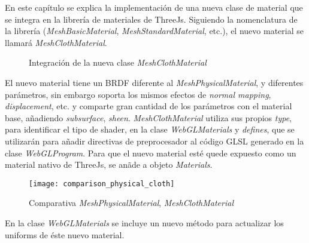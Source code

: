 En este cap\'itulo se explica la implementaci\'on de una nueva clase de material que se integra en la librer\'ia de materiales
de ThreeJs. Siguiendo la nomenclatura de la librer\'ia (\textit{MeshBasicMaterial}, \textit{MeshStandardMaterial}, etc.), el
nuevo material se llamar\'a \textit{MeshClothMaterial}.




\begin{figure}[H]
  \centering
  \caption{Integraci\'on de la nueva clase \textit{MeshClothMaterial}}
\end{figure}
\singlespacing

El nuevo material tiene un BRDF diferente al \textit{MeshPhysicalMaterial},
y diferentes par\'ametros, sin embargo soporta los mismos efectos de \textit{normal mapping}, \textit{displacement}, etc.
y comparte gran cantidad de los par\'ametros con el material base, a\~nadiendo \textit{subsurface}, \textit{sheen}.
\textit{MeshClothMaterial} utiliza sus propios \textit{type}, para identificar el tipo de shader, en la clase \textit{WebGLMaterials}
y \textit{defines}, que se utilizar\'an para a\~nadir directivas de preprocesador al c\'odigo GLSL generado en la clase
\textit{WebGLProgram}. Para que el nuevo material est\'e quede expuesto como un material nativo de ThreeJs,
se an\~ade a objeto \textit{Materials}.

\begin{figure}[H]
  \vspace{0.5cm}
  \centering
    \texttt{[image: comparison\_physical\_cloth]}
  \caption{Comparativa \textit{MeshPhysicalMaterial}, \textit{MeshClothMaterial}}
  \vspace{0.5cm}
\end{figure}


En la clase \textit{WebGLMaterials} se incluye un nuevo m\'etodo para actualizar los uniforms de \'este nuevo material.\\

